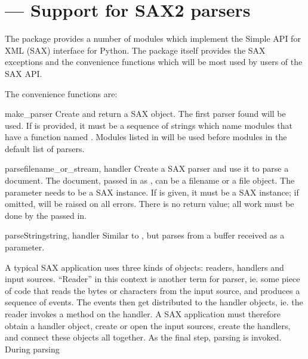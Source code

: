 \section{ ---
         Support for SAX2 parsers}




The  package provides a number of modules which
implement the Simple API for XML (SAX) interface for Python.  The
package itself provides the SAX exceptions and the convenience
functions which will be most used by users of the SAX API.

The convenience functions are:

\begin{funcdesc}{make_parser}{}
  Create and return a SAX  object.  The first parser
  found will be used.  If  is provided, it must be a
  sequence of strings which name modules that have a function named
  .  Modules listed in 
  will be used before modules in the default list of parsers.
\end{funcdesc}

\begin{funcdesc}{parse}{filename_or_stream, handler}
  Create a SAX parser and use it to parse a document.  The document,
  passed in as , can be a filename or a file
  object.  The  parameter needs to be a SAX
   instance.  If  is given,
  it must be a SAX  instance; if omitted, 
   will be raised on all errors.  There
  is no return value; all work must be done by the 
  passed in.
\end{funcdesc}

\begin{funcdesc}{parseString}{string, handler}
  Similar to , but parses from a buffer 
  received as a parameter.
\end{funcdesc}

A typical SAX application uses three kinds of objects: readers,
handlers and input sources. ``Reader'' in this context is another term
for parser, ie. some piece of code that reads the bytes or characters
from the input source, and produces a sequence of events. The events
then get distributed to the handler objects, ie. the reader invokes a
method on the handler. A SAX application must therefore obtain a
handler object, create or open the input sources, create the handlers,
and connect these objects all together. As the final step, parsing is
invoked. During parsing

